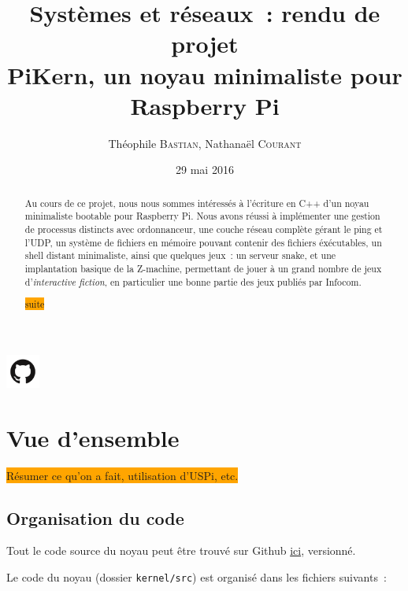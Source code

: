 \documentclass[11pt,a4paper]{article}
\author{Théophile \textsc{Bastian}, Nathanaël \textsc{Courant}}
\title{Systèmes et réseaux~: rendu de projet\\
{\small PiKern, un noyau minimaliste pour Raspberry Pi}}
\date{29 mai 2016}
\newcommand{\fname}[1]{\texttt{#1}} %
\newcommand{\todo}[1]{\colorbox{orange}{\color{blue}{\Large TODO:} #1}}
\begin{document}
\maketitle

\begin{abstract}
Au cours de ce projet, nous nous sommes intéressés à l'écriture en C++ d'un
noyau minimaliste bootable pour Raspberry Pi. Nous avons réussi à implémenter
une gestion de processus distincts avec ordonnanceur, une couche réseau
complète gérant le ping et l'UDP, un système de fichiers en mémoire
pouvant contenir des fichiers éxécutables, un shell distant
minimaliste, ainsi que quelques jeux~: un serveur snake, et une
implantation basique de la Z-machine, permettant de jouer à un grand
nombre de jeux d'\textit{interactive fiction}, en particulier une
bonne partie des jeux publiés par Infocom.

	\todo{suite}
\end{abstract}

\begin{center}
	\href{https://github.com/tobast/sysres-pikern}
		{\Large \includegraphics[height=3em]{github.png}
		}
\end{center}

\tableofcontents
\newpage

\section{Vue d'ensemble}

\todo{Résumer ce qu'on a fait, utilisation d'USPi, etc.}

\subsection{Organisation du code}

Tout le code source du noyau peut être trouvé sur Github
\href{https://github.com/tobast/sysres-pikern}{ici}, versionné.

Le code du noyau (dossier \fname{kernel/src}) est organisé dans les fichiers
suivants~:
\end{document}
